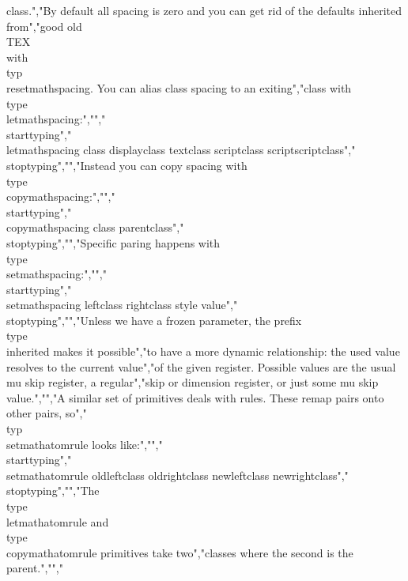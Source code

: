 class.","By default all spacing is zero and you can get rid of the defaults inherited from","good old \\TEX\\ with \\typ {\\resetmathspacing}. You can alias class spacing to an exiting","class with \\type {\\letmathspacing}:","","\\starttyping","\\letmathspacing class displayclass textclass scriptclass scriptscriptclass","\\stoptyping","","Instead you can copy spacing with \\type {\\copymathspacing}:","","\\starttyping","\\copymathspacing class parentclass","\\stoptyping","","Specific paring happens with \\type {\\setmathspacing}:","","\\starttyping","\\setmathspacing leftclass rightclass style value","\\stoptyping","","Unless we have a frozen parameter, the prefix \\type {\\inherited} makes it possible","to have a more dynamic relationship: the used value resolves to the current value","of the given register. Possible values are the usual mu skip register, a regular","skip or dimension register, or just some mu skip value.","","A similar set of primitives deals with rules. These remap pairs onto other pairs, so","\\typ {\\setmathatomrule} looks like:","","\\starttyping","\\setmathatomrule oldleftclass oldrightclass newleftclass newrightclass","\\stoptyping","","The \\type {\\letmathatomrule} and \\type {\\copymathatomrule} primitives take two","classes where the second is the parent.","","%